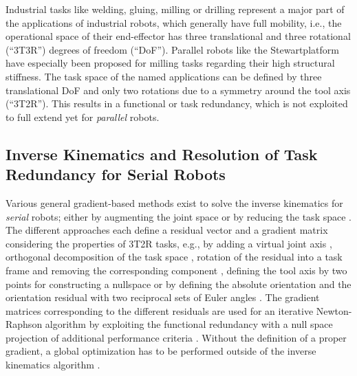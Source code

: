 \documentclass[robotics,article,accept,moreauthors,pdftex]{Definitions/mdpi}
\begin{document}
Industrial tasks like welding, gluing, milling or drilling represent a major part of the applications of industrial robots, which generally have full mobility, i.e., the operational space of their end-effector has three translational and three rotational (``3T3R'') degrees of freedom (``DoF'').
Parallel robots like the Stewart\replaced[id=Sp]{ }{-}platform have especially been proposed for milling tasks regarding their high structural stiffness.
The task space of the named applications can be defined by three translational DoF and only two rotations due to a symmetry around the tool axis (``3T2R'').
This results in a functional or task redundancy, which is not exploited to full extend yet for \emph{parallel} robots. %

\subsection{Inverse Kinematics and Resolution of Task Redundancy for Serial Robots}

Various general gradient-based methods exist to solve the inverse kinematics for \emph{serial} robots; either by augmenting the joint space \cite{Baron2000} or by reducing the task space \cite{HuoBar2005,Zlajpah2017,LegerAng2016,1_SchapplerTapOrt2019}.
The different approaches each define a residual vector and a gradient matrix considering the properties of 3T2R tasks, e.g., by adding a virtual joint axis \cite{Baron2000}, orthogonal decomposition of the task space \cite{HuoBar2005}, rotation of the residual into a task frame and removing the corresponding component \cite{Zlajpah2017}, defining the tool axis by two points for constructing a nullspace \cite{LegerAng2016} or by defining the absolute orientation and the orientation residual with two reciprocal sets of Euler angles \cite{1_SchapplerTapOrt2019}.
The gradient matrices corresponding to the different residuals are used for an iterative Newton-Raphson algorithm \cite{Yoshikawa1984,GoldenbergBenFen1985} by exploiting the functional redundancy with a null space projection of additional performance criteria \cite{Yoshikawa1984}.
Without the definition of a proper gradient, a global optimization has to be performed outside of the inverse kinematics algorithm \cite{ZhuQuCaoYan2013,GuoDonKe2015}.
\end{document}
